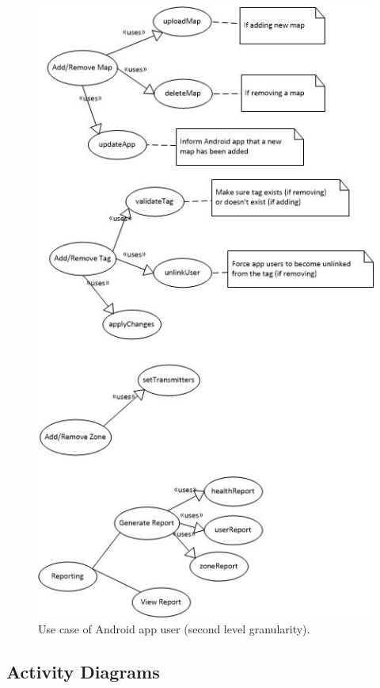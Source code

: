 \documentclass[11pt,titlepage]{article} %
\begin{document}
\begin{figure}[H]
\centering
\includegraphics[scale=1]{AdminLvl2.jpg}
\caption{Use case of Android app user (second level granularity).}
\end{figure}

\subsection{Activity Diagrams}
\end{document}
